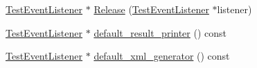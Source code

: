 \begin{DoxyCompactItemize}
\item 
\hyperlink{classtesting_1_1TestEventListener}{\-Test\-Event\-Listener} $\ast$ \hyperlink{classtesting_1_1TestEventListeners_aa2026c03637b3e7dbde6011e39ef7527}{\-Release} (\hyperlink{classtesting_1_1TestEventListener}{\-Test\-Event\-Listener} $\ast$listener)
\item 
\hyperlink{classtesting_1_1TestEventListener}{\-Test\-Event\-Listener} $\ast$ \hyperlink{classtesting_1_1TestEventListeners_ae392a6cbcda42ad1406ae496d3fa9e84}{default\-\_\-result\-\_\-printer} () const 
\item 
\hyperlink{classtesting_1_1TestEventListener}{\-Test\-Event\-Listener} $\ast$ \hyperlink{classtesting_1_1TestEventListeners_af9e25abc9e310f09dabc9e833efa97d0}{default\-\_\-xml\-\_\-generator} () const 
\end{DoxyCompactItemize}
